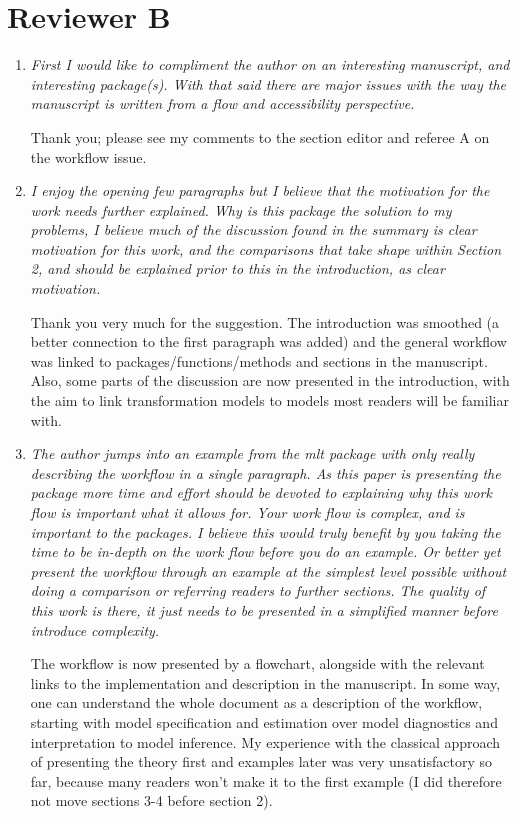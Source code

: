 \documentclass[12pt]{article}
\begin{document}
\section*{Reviewer B}

\begin{enumerate}

\item \textit{First I would like to compliment the author on an interesting
manuscript, and interesting package(s).  With that said there are major
issues with the way the manuscript is written from a flow and accessibility
perspective.  }

Thank you; please see my comments to the section editor and referee A on
the workflow issue.

\item \textit{I enjoy the opening few paragraphs but I believe that the
motivation for the work needs further explained.  Why is this package the
solution to my problems, I believe much of the discussion found in the
summary is clear motivation for this work, and the comparisons that take
shape within Section 2, and should be explained prior to this in the
introduction, as clear motivation.  }

Thank you very much for the suggestion. The introduction was smoothed (a
better connection to the first paragraph was added) and the general workflow
was linked to packages/functions/methods and sections in the manuscript.
Also, some parts of the discussion are now presented in the introduction,
with the aim to link transformation models to models most readers will be
familiar with.

\item \textit{The author jumps into an example from the mlt package with
only really describing the workflow in a single paragraph.  As this paper is
presenting the package more time and effort should be devoted to explaining
why this work flow is important what it allows for.  Your work flow is
complex,  and  is important to the packages.  I believe this would truly
benefit by you taking the time to be in-depth on the work flow before you do
an example.  Or better yet present the workflow through an example at the
simplest level possible without doing a comparison or referring readers to
further sections.  The quality of this work is there, it just needs to be
presented in a simplified manner before introduce complexity.  }

The workflow is now presented by a flowchart, alongside with the relevant
links to the implementation and description in the manuscript. In some way,
one can understand the whole document as a description of the workflow,
starting with model specification and estimation over model diagnostics and
interpretation to model inference. My experience with the classical approach 
of presenting the theory first and examples later was very unsatisfactory so
far, because many readers won't make it to the first example (I did
therefore not move sections 3-4 before section 2).


\end{enumerate}
\end{document}
